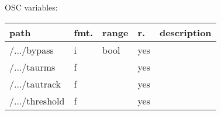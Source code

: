 \begin{snugshade}
{\footnotesize
\label{osctab:tascarapgate}
OSC variables:
\nopagebreak

\begin{tabularx}{\textwidth}{llllX}
\hline
path & fmt. & range & r. & description\\
\hline
/.../bypass & i & bool & yes & \\
/.../taurms & f &  & yes & \\
/.../tautrack & f &  & yes & \\
/.../threshold & f &  & yes & \\
\hline
\end{tabularx}
}
\end{snugshade}
